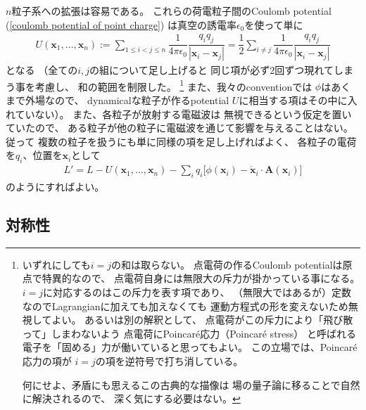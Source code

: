$n$粒子系への拡張は容易である。
これらの荷電粒子間のCoulomb potential
(\ref{coulomb potential of point charge})
は真空の誘電率$\epsilon_0$を使って単に
\begin{align}
  U(\bm{x}_1, \dots, \bm{x}_n)
  :=
  \sum_{1 \le i < j \le n}
  \dfrac{1}{4 \pi \epsilon_0}
  \dfrac{q_i q_j}{|\bm{x}_i - \bm{x}_j|}
  =
  \dfrac{1}{2}
  \sum_{i \neq j}
  \dfrac{1}{4 \pi \epsilon_0}
  \dfrac{q_i q_j}{|\bm{x}_i - \bm{x}_j|}
\end{align}
となる
（全ての$i, j$の組について足し上げると
同じ項が必ず$2$回ずつ現れてしまう事を考慮し、
和の範囲を制限した。
\footnote{
  いずれにしても$i = j$の和は取らない。
  点電荷の作るCoulomb potentialは原点で特異的なので、
  点電荷自身には無限大の斥力が掛かっている事になる。
  $i = j$に対応するのはこの斥力を表す項であり、
  （無限大ではあるが）定数なのでLagrangianに加えても加えなくても
  運動方程式の形を変えないため無視してよい。
  あるいは別の解釈として、
  点電荷がこの斥力により「飛び散って」しまわないよう
  点電荷にPoincar\'e応力（Poincar\'e stress）
  と呼ばれる電子を「固める」力が働いていると思ってもよい。
  この立場では、Poincar\'e応力の項が
  $i = j$の項を逆符号で打ち消している。

  何にせよ、矛盾にも思えるこの古典的な描像は
  場の量子論に移ることで自然に解決されるので、
  深く気にする必要はない。
}
また、我々のconventionでは
$\phi$はあくまで外場なので、
dynamicalな粒子が作るpotential
$U$に相当する項はその中に入れていない）。
また、各粒子が放射する電磁波は
無視できるという仮定を置いていたので、
ある粒子が他の粒子に電磁波を通じて影響を与えることはない。
従って
複数の粒子を扱うにも単に同様の項を足し上げればよく、
各粒子の電荷を$q_i$、位置を$\bm{x}_i$として
\begin{align}
  L' = L
  -
  U(\bm{x}_1, \dots, \bm{x}_n)
  -
  \sum_i
  q_i\Big[
    \phi(\bm{x}_i)
  -
    \dot{\bm{x}}_i \cdot \bm{A}(\bm{x}_i)
  \Big]
\label{many point particle lagrangian with ele-mag potential}
\end{align}
のようにすればよい。

\subsection{対称性}

